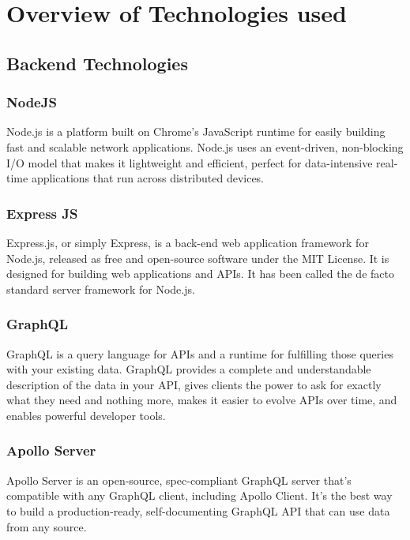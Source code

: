 \section{Overview of Technologies used}

\subsection{Backend Technologies}

    \subsubsection{NodeJS}
    Node.js is a platform built on Chrome's JavaScript runtime for easily building fast and scalable network applications. 
    Node.js uses an event-driven, non-blocking I/O model that makes it lightweight and efficient, perfect for data-intensive 
    real-time applications that run across distributed devices.

    \subsubsection{Express JS}
    Express.js, or simply Express, is a back-end web application framework for Node.js, released as free and open-source software under the MIT License. 
    It is designed for building web applications and APIs.
    It has been called the de facto standard server framework for Node.js.

    \subsubsection{GraphQL}
    GraphQL is a query language for APIs and a runtime for fulfilling those queries with your existing data. 
    GraphQL provides a complete and understandable description of the data in your API, gives clients the power to ask for exactly what they need and nothing more, 
    makes it easier to evolve APIs over time, and enables powerful developer tools.

    \subsubsection{Apollo Server}
    Apollo Server is an open-source, spec-compliant GraphQL server that's compatible with any GraphQL client, including Apollo Client. 
    It's the best way to build a production-ready, self-documenting GraphQL API that can use data from any source.

